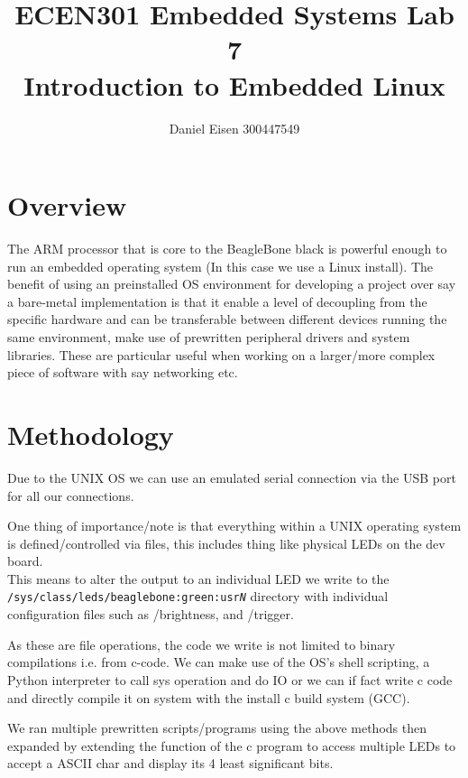 \documentclass[11pt]{article}
\title{ECEN301 Embedded Systems Lab 7 \\ Introduction to Embedded Linux}
\author{Daniel Eisen 300447549}
\begin{document}
\begin{preview}
    \maketitle
    \section{Overview}
    The ARM processor that is core to the BeagleBone black is powerful enough to run an embedded operating system (In this case we use a Linux install). The benefit of using an preinstalled OS environment for developing a project over say a bare-metal implementation is that it enable a level of decoupling from the specific hardware and can be transferable between different devices running the same environment, make use of prewritten peripheral drivers and system libraries. These are particular useful when working on a larger/more complex piece of software with say networking etc.

    \section{Methodology}

        Due to the UNIX OS we can use an emulated serial connection via the USB port for all our connections.

        One thing of importance/note is that everything within a UNIX operating system is defined/controlled via files, this includes thing like physical LEDs on the dev board.\\

        This means to alter the output to an individual LED we write to the \\ \texttt{/sys/class/leds/beaglebone:green:usr\textit{N}} directory with individual configuration files such as /brightness, and /trigger.

        As these are file operations, the code we write is not limited to binary compilations i.e. from c-code. We can make use of the OS's shell scripting, a Python interpreter to call sys operation and do IO or we can if fact write c code and directly compile it on system with the install c build system (GCC).

        We ran multiple prewritten scripts/programs using the above methods then expanded by extending the function of the c program to access multiple LEDs to accept a ASCII char and display its 4 least significant bits.


\end{preview}
\end{document}

